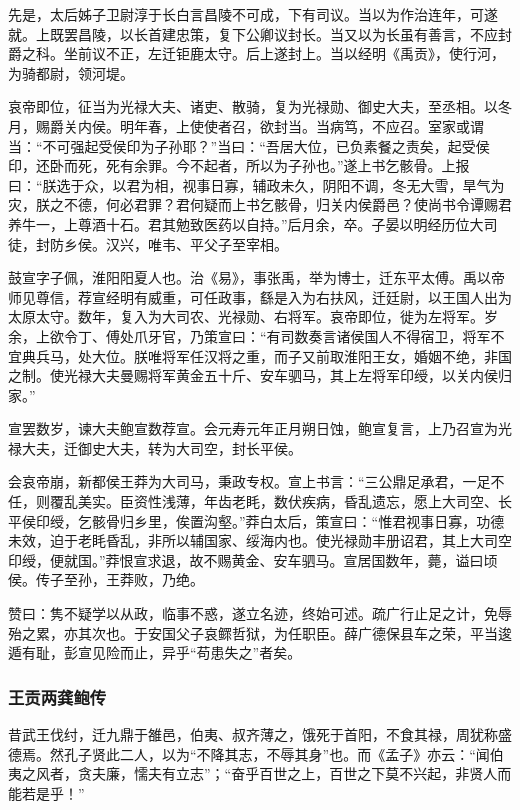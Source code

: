 \documentclass[]{article}
\begin{document}
先是，太后姊子卫尉淳于长白言昌陵不可成，下有司议。当以为作治连年，可遂就。上既罢昌陵，以长首建忠策，复下公卿议封长。当又以为长虽有善言，不应封爵之科。坐前议不正，左迁钜鹿太守。后上遂封上。当以经明《禹贡》，使行河，为骑都尉，领河堤。

哀帝即位，征当为光禄大夫、诸吏、散骑，复为光禄勋、御史大夫，至丞相。以冬月，赐爵关内侯。明年春，上使使者召，欲封当。当病笃，不应召。室家或谓当：``不可强起受侯印为子孙耶？''当曰：``吾居大位，已负素餐之责矣，起受侯印，还卧而死，死有余罪。今不起者，所以为子孙也。''遂上书乞骸骨。上报曰：``朕选于众，以君为相，视事日寡，辅政未久，阴阳不调，冬无大雪，旱气为灾，朕之不德，何必君罪？君何疑而上书乞骸骨，归关内侯爵邑？使尚书令谭赐君养牛一，上尊酒十石。君其勉致医药以自持。''后月余，卒。子晏以明经历位大司徒，封防乡侯。汉兴，唯韦、平父子至宰相。

鼓宣字子佩，淮阳阳夏人也。治《易》，事张禹，举为博士，迁东平太傅。禹以帝师见尊信，荐宣经明有威重，可任政事，繇是入为右扶风，迁廷尉，以王国人出为太原太守。数年，复入为大司农、光禄勋、右将军。哀帝即位，徙为左将军。岁余，上欲令丁、傅处爪牙官，乃策宣曰：``有司数奏言诸侯国人不得宿卫，将军不宜典兵马，处大位。朕唯将军任汉将之重，而子又前取淮阳王女，婚姻不绝，非国之制。使光禄大夫曼赐将军黄金五十斤、安车驷马，其上左将军印绶，以关内侯归家。''

宣罢数岁，谏大夫鲍宣数荐宣。会元寿元年正月朔日蚀，鲍宣复言，上乃召宣为光禄大夫，迁御史大夫，转为大司空，封长平侯。

会哀帝崩，新都侯王莽为大司马，秉政专权。宣上书言：``三公鼎足承君，一足不任，则覆乱美实。臣资性浅薄，年齿老眊，数伏疾病，昏乱遗忘，愿上大司空、长平侯印绶，乞骸骨归乡里，俟置沟壑。''莽白太后，策宣曰：``惟君视事日寡，功德未效，迫于老眊昏乱，非所以辅国家、绥海内也。使光禄勋丰册诏君，其上大司空印绶，便就国。''莽恨宣求退，故不赐黄金、安车驷马。宣居国数年，薨，谥曰顷侯。传子至孙，王莽败，乃绝。

赞曰：隽不疑学以从政，临事不惑，遂立名迹，终始可述。疏广行止足之计，免辱殆之累，亦其次也。于安国父子哀鳏哲狱，为任职臣。薛广德保县车之荣，平当逡遁有耻，彭宣见险而止，异乎``苟患失之''者矣。

\hypertarget{header-n5205}{%
\subsubsection{王贡两龚鲍传}\label{header-n5205}}

昔武王伐纣，迁九鼎于雒邑，伯夷、叔齐薄之，饿死于首阳，不食其禄，周犹称盛德焉。然孔子贤此二人，以为``不降其志，不辱其身''也。而《孟子》亦云：``闻伯夷之风者，贪夫廉，懦夫有立志''；``奋乎百世之上，百世之下莫不兴起，非贤人而能若是乎！''
\end{document}
